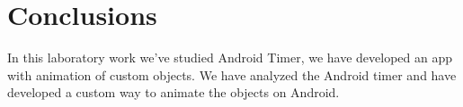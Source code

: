\section*{Conclusions}

In this laboratory work we've studied Android Timer, we have developed an app with animation of custom objects. We have analyzed the Android timer and have developed a custom way to animate the objects on Android.

\clearpage